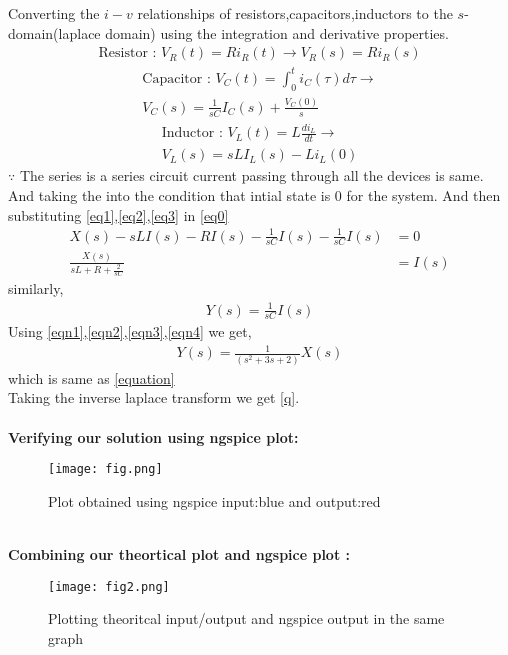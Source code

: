 \documentclass[journal,12pt,twocolumn]{IEEEtran}
\begin{document}
Converting the $i-v $ relationships of resistors,capacitors,inductors to the $s$-domain(laplace domain) using the integration and derivative properties.
\begin{align}
     \text{Resistor : }V_{R}(t) = Ri_{R}(t) \rightarrow V_{R}(s) = Ri_{R}(s) \label{eq1}
\end{align}
\begin{multline}
     \text{Capacitor : } V_{C}(t) =
     \int_{0}^{t}i_{C}(\tau)d \tau \rightarrow\\ V_{C}(s) = \frac{1}{sC}I_{C}(s) + \frac{V_{C}(0)}{s} \label{eq2}
\end{multline}
\begin{multline}
     \text{Inductor : } V_{L}(t) =
     L \frac{di_{L}}{dt} \rightarrow\\ V_{L}(s) = sLI_{L}(s) - Li_{L}(0) \label{eq3}
\end{multline}
$\because$ The series is a series circuit current passing through all the devices is same.\\
And taking the into the condition that intial state is 0 for the system. And then substituting \eqref{eq1},\eqref{eq2},\eqref{eq3} in \eqref{eq0}
\begin{align}
    X(s)-sLI(s)-RI(s)-\frac{1}{sC}I(s) - \frac{1}{sC}I(s)&=0\\
    \frac{X(s)}{sL + R + \frac{2}{sC}}&=I(s) \label{eqn1}
\end{align}
similarly,
\begin{align}
    Y(s) = \frac{1}{sC} I(s) \label{eqn2}
\end{align}
Using \eqref{eqn1},\eqref{eqn2},\eqref{eqn3},\eqref{eqn4} we get,
\begin{align}
    Y(s)=\frac{1}{(s^2+3s+2)}X(s)
\end{align}
which is same as \eqref{equation}\\
Taking the inverse laplace transform we get \eqref{q}.\\\\
\textbf{Verifying our solution using ngspice plot:}
\begin{figure}[htp]
    \centering
    \texttt{[image: fig.png]}
    \caption{Plot obtained using ngspice input:blue and output:red}
    \label{fig:my_label}
\end{figure}\\
\textbf{Combining our theortical plot and ngspice plot :}
\begin{figure}[htp]
    \centering
    \texttt{[image: fig2.png]}
    \caption{Plotting theoritcal input/output and ngspice output in the same graph }
    \label{fig:my_label}
\end{figure}
\end{document}
